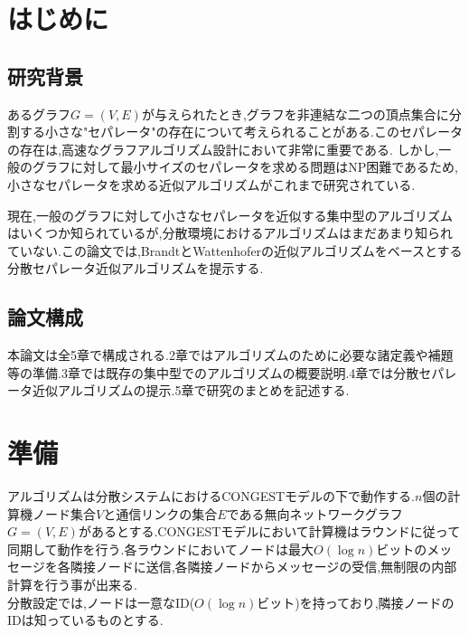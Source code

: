 \documentclass{thesis}
\theoremstyle{definition}
\begin{document}
\baselineskip=22pt
\pagestyle{empty}

\maketitle

\pagestyle{myheadings}	%
\tableofcontents

\newpage


\chapter{はじめに}

\section{研究背景}

あるグラフ$G=(V,E)$が与えられたとき,グラフを非連結な二つの頂点集合に分割する小さな"セパレータ"の存在について考えられることがある.このセパレータの存在は,高速なグラフアルゴリズム設計において非常に重要である.
しかし,一般のグラフに対して最小サイズのセパレータを求める問題はNP困難であるため,小さなセパレータを求める近似アルゴリズムがこれまで研究されている.\par
現在,一般のグラフに対して小さなセパレータを近似する集中型のアルゴリズムはいくつか知られているが,分散環境におけるアルゴリズムはまだあまり知られていない.この論文では,BrandtとWattenhoferの近似アルゴリズム\cite{brandt2017approximating}をベースとする分散セパレータ近似アルゴリズムを提示する.

\section{論文構成}
本論文は全5章で構成される.2章ではアルゴリズムのために必要な諸定義や補題等の準備.3章では既存の集中型でのアルゴリズムの概要説明.4章では分散セパレータ近似アルゴリズムの提示.5章で研究のまとめを記述する.

\chapter{準備}
アルゴリズムは分散システムにおけるCONGESTモデルの下で動作する.$n$個の計算機ノード集合$V$と通信リンクの集合$E$である無向ネットワークグラフ$G=(V,E)$があるとする.CONGESTモデルにおいて計算機はラウンドに従って同期して動作を行う.各ラウンドにおいてノードは最大$O(\log n)$ビットのメッセージを各隣接ノードに送信,各隣接ノードからメッセージの受信,無制限の内部計算を行う事が出来る.\\
分散設定では,ノードは一意なID($O(\log n)$ビット)を持っており,隣接ノードのIDは知っているものとする.\par
\end{document}
